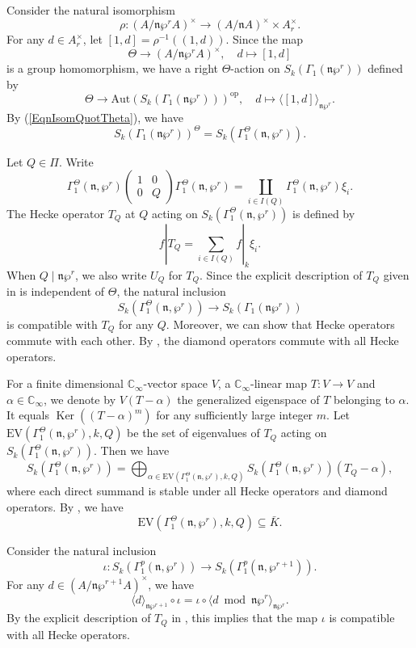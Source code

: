 \documentclass[11pt]{amsart}
\theoremstyle{plain}
\theoremstyle{definition}
\newcommand{\Aut}{\mathrm{Aut}}
\newcommand{\EV}{\mathrm{EV}}
\DeclareMathOperator{\Ker}{Ker}
\newcommand{\opp}{\mathrm{op}}
\newcommand{\frn}{\mathfrak{n}}
\newcommand{\Cinf}{\mathbb{C}_{\infty}}
\begin{document}
Consider the natural isomorphism
\[
\rho:(A/\frn\wp^rA)^\times\to (A/\frn A)^\times \times A_r^\times.
\]
For any $d\in A_r^\times$, let $[1,d]=\rho^{-1}((1,d))$.
Since the map
\[
\Theta\to (A/\frn\wp^rA)^\times,\quad d\mapsto [1,d]
\]
is a group homomorphism, we have a right $\Theta$-action on $S_k(\Gamma_1(\frn\wp^r))$ defined by
\[
\Theta\to \Aut(S_k(\Gamma_1(\frn\wp^r)))^\opp,\quad d\mapsto \langle [1,d]\rangle_{\frn\wp^r}.
\]
By (\ref{EqnIsomQuotTheta}), we have
\begin{equation}\label{EqnThetaFixed}
	S_k(\Gamma_1(\frn\wp^r))^\Theta=S_k(\Gamma_1^\Theta(\frn,\wp^r)).
\end{equation} 

Let $Q\in \Pi$. Write
\[
\Gamma_1^\Theta(\frn,\wp^r)\begin{pmatrix}
	1&0\\0&Q
\end{pmatrix}\Gamma_1^\Theta(\frn,\wp^r)=\coprod_{i\in I(Q)}\Gamma_1^\Theta(\frn,\wp^r) \xi_i.
\]
The Hecke operator $T_Q$ at $Q$ acting on $S_k(\Gamma_1^\Theta(\frn,\wp^r))$
is defined by
\[
f|T_Q =\sum_{i\in I(Q)} f|_k\xi_i.
\]
When $Q\mid \frn\wp^r$, we also write $U_Q$ for $T_Q$.
Since the explicit description of $T_Q$ given in \cite[\S3.1]{Ha_DMBF} is independent of $\Theta$, the natural inclusion
\[
S_k(\Gamma_1^\Theta(\frn,\wp^r))\to S_k(\Gamma_1(\frn\wp^r))
\]
is compatible with $T_Q$ for any $Q$. Moreover, we can show that Hecke operators commute with each other.
By \cite[Lemma 2.3]{Ha_DMO}, the diamond operators commute with all 
Hecke operators.



For a finite dimensional $\Cinf$-vector space $V$, a $\Cinf$-linear map $T:V\to V$ and $\alpha\in \Cinf$, we denote by 
$V(T-\alpha)$ the generalized eigenspace of $T$ belonging to $\alpha$.
It equals $\Ker((T-\alpha)^m)$ for any sufficiently large integer $m$.
Let $\EV(\Gamma_1^\Theta(\frn,\wp^r),k,Q)$ be the set of eigenvalues of $T_Q$
acting on $S_k(\Gamma_1^\Theta(\frn,\wp^r))$. Then we have
\begin{equation}\label{EqnGenESDecomp}
S_k(\Gamma_1^\Theta(\frn,\wp^r))=\bigoplus_{\alpha\in \EV(\Gamma_1^\Theta(\frn,\wp^r),k,Q)} S_k(\Gamma_1^\Theta(\frn,\wp^r))(T_Q-\alpha),
\end{equation}
where each direct summand is stable under all Hecke operators and diamond operators. By \cite[Proposition 2.2]{Ha_DMBF}, we have
\[
\EV(\Gamma_1^\Theta(\frn,\wp^r),k,Q)\subseteq \bar{K}.
\]

Consider the natural inclusion
\[
\iota: S_k(\Gamma^p_1(\frn,\wp^r))\to S_k(\Gamma^p_1(\frn,\wp^{r+1})).
\]
For any $d\in (A/\frn\wp^{r+1}A)^\times$, we have 
\[
\langle d\rangle_{\frn\wp^{r+1}}\circ \iota=\iota\circ \langle d\bmod \frn\wp^r\rangle_{\frn\wp^{r}}.
\]
By the explicit description of $T_Q$ in \cite[\S3.1]{Ha_DMBF}, this implies that the map $\iota$ is compatible with all Hecke operators.
\end{document}
